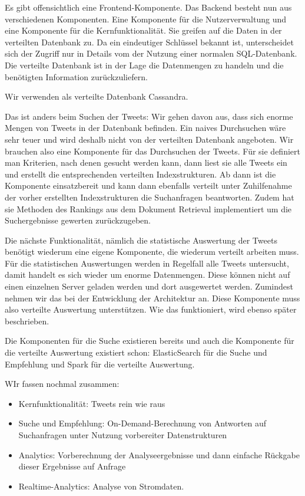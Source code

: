 Es gibt offensichtlich eine Frontend-Komponente. Das Backend besteht nun aus verschiedenen Komponenten. Eine Komponente
für die Nutzerverwaltung und eine Komponente für die Kernfunktionalität. Sie greifen auf die Daten in der verteilten Datenbank
zu. Da ein eindeutiger Schlüssel bekannt ist, unterscheidet sich der Zugriff nur in Details vom der Nutzung einer normalen
SQL-Datenbank. Die verteilte Datenbank ist in der Lage die Datenmengen zu handeln und die benötigten Information zurückzuliefern.

Wir verwenden als verteilte Datenbank Cassandra.

Das ist anders beim Suchen der Tweets: Wir gehen davon aus, dass sich enorme Mengen von Tweets in der Datenbank befinden.
Ein naives Durchsuchen wäre sehr teuer und wird deshalb nicht von der verteilten Datenbank angeboten. Wir brauchen also
eine Komponente für das Durchsuchen der Tweets.  Für sie definiert man Kriterien, nach denen gesucht werden kann,
dann liest sie alle Tweets ein und erstellt die entsprechenden verteilten Indexstrukturen. Ab dann ist die Komponente einsatzbereit
und kann dann ebenfalls verteilt unter Zuhilfenahme der vorher erstellten Indexstrukturen die Suchanfragen beantworten.
Zudem hat sie Methoden des Rankings aus dem Dokument Retrieval implementiert um die Suchergebnisse gewerten zurückzugeben.

Die nächste Funktionalität, nämlich die statistische Auswertung der Tweets benötigt wiederum eine eigene Komponente, die
wiederum verteilt arbeiten muss. Für die statistischen Auswertungen werden in Regelfall alle Tweets untersucht,
damit handelt es sich wieder um enorme Datenmengen. Diese können nicht auf einen einzelnen Server geladen werden
und dort ausgewertet werden. Zumindest nehmen wir das bei der Entwicklung der Architektur an. Diese Komponente muss
also verteilte Auswertung unterstützen. Wie das funktioniert, wird ebenso später beschrieben.

Die Komponenten für die Suche existieren bereits und auch die Komponente für die verteilte Auswertung existiert schon:
ElasticSearch für die Suche und Empfehlung und Spark für die verteilte Auswertung.

WIr fassen nochmal zusammen:
\begin{itemize}
  \item Kernfunktionalität: Tweets rein wie raus
  \item Suche und Empfehlung: On-Demand-Berechnung von Antworten auf Suchanfragen unter Nutzung vorbereiter Datenstrukturen
  \item Analytics: Vorberechnung der Analyseergebnisse und dann einfache Rückgabe dieser Ergebnisse auf Anfrage
  \item Realtime-Analytics: Analyse von Stromdaten.
\end{itemize}

